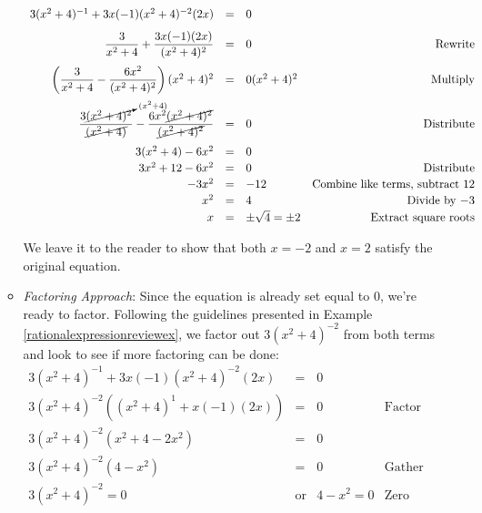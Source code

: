 \begin{ex}
\begin{enumerate}
\begin{itemize}
\[\begin{array}{rclr}
3(x^2+4)^{-1} + 3x(-1)(x^2+4)^{-2}(2x)& = &  0 & \\ [8pt]

\dfrac{3}{x^2+4} + \dfrac{3x(-1)(2x)}{(x^2+4)^2} & = & 0 & \text{Rewrite} \\ [12pt]
\left(\dfrac{3}{x^2+4} - \dfrac{6x^2}{(x^2+4)^2} \right)(x^2+4)^2 & = & 0 (x^2+4)^2 & \text{Multiply} \\[12pt]

\dfrac{3\cancelto{(x^2+4)}{(x^2 + 4)^2}}{\cancel{(x^2+4)}}  - \dfrac{6x^2\cancel{(x^2+4)^2}}{\cancel{(x^2+4)^2}} & = & 0 & \text{Distribute} \\ [12pt]

3(x^2+4) - 6x^2 & = & 0 & \\ [2pt]

3x^2 + 12 - 6x^2 & = & 0 & \text{Distribute} \\ [2pt]

-3x^2 & = & -12 & \text{Combine like terms, subtract $12$} \\ [2pt]

x^2 & = & 4 & \text{Divide by $-3$} \\ [2pt]

x & = & \pm \sqrt{4} = \pm 2 & \text{Extract square roots} \\ 

\end{array} \]

We leave it to the reader to show that both $x = -2$ and $x = 2$ satisfy the original equation.

\item  \textit{Factoring Approach}:  Since the equation is already set equal to $0$, we're ready to factor. Following the guidelines presented in Example \ref{rationalexpressionreviewex}, we factor out $3(x^2+4)^{-2}$ from both terms and look to see if more factoring can be done:\[ \begin{array}{rclr}

3(x^2+4)^{-1} + 3x(-1)(x^2+4)^{-2}(2x)& = &  0 & \\ [2pt]

3(x^2+4)^{-2}( (x^2+4)^{1} + x(-1)(2x)) & = & 0 & \text{Factor} \\ [2pt]

3(x^2+4)^{-2}( x^2 + 4 - 2x^2 ) & = & 0 & \\ [2pt]

3(x^2+4)^{-2}(4 - x^2) & = & 0 & \text{Gather like terms} \\ [2pt]

3(x^2+4)^{-2} = 0 & \text{or} & 4 - x^2 = 0 & \text{Zero Product Property} \\ [2pt]


\end{array}\]
\end{itemize}
\end{enumerate}
\end{ex}
